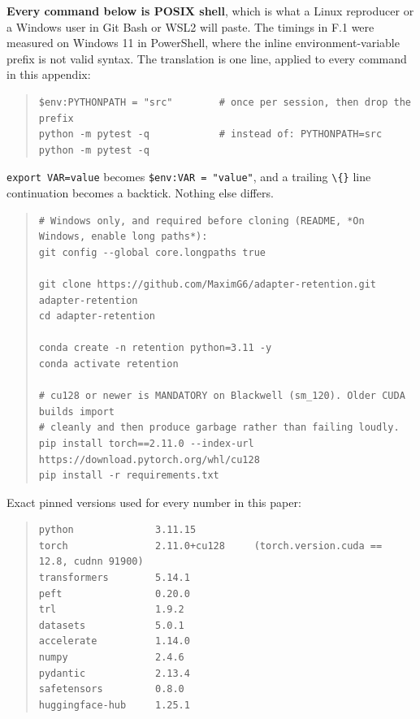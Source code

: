 \textbf{Every command below is POSIX shell}, which is what a Linux reproducer or a Windows user in Git Bash or WSL2 will paste. The timings in F.1 were measured on Windows 11 in PowerShell, where the inline environment-variable prefix is not valid syntax. The translation is one line, applied to every command in this appendix:

\begin{quote}\tiny\begin{verbatim}
$env:PYTHONPATH = "src"        # once per session, then drop the prefix
python -m pytest -q            # instead of: PYTHONPATH=src python -m pytest -q
\end{verbatim}\end{quote}

\texttt{export VAR=value} becomes \texttt{\$env:VAR = "value"}, and a trailing \texttt{\textbackslash\{\}} line continuation becomes a backtick. Nothing else differs.

\begin{quote}\tiny\begin{verbatim}
# Windows only, and required before cloning (README, *On Windows, enable long paths*):
git config --global core.longpaths true

git clone https://github.com/MaximG6/adapter-retention.git adapter-retention
cd adapter-retention

conda create -n retention python=3.11 -y
conda activate retention

# cu128 or newer is MANDATORY on Blackwell (sm_120). Older CUDA builds import
# cleanly and then produce garbage rather than failing loudly.
pip install torch==2.11.0 --index-url https://download.pytorch.org/whl/cu128
pip install -r requirements.txt
\end{verbatim}\end{quote}

Exact pinned versions used for every number in this paper:

\begin{quote}\tiny\begin{verbatim}
python              3.11.15
torch               2.11.0+cu128     (torch.version.cuda == 12.8, cudnn 91900)
transformers        5.14.1
peft                0.20.0
trl                 1.9.2
datasets            5.0.1
accelerate          1.14.0
numpy               2.4.6
pydantic            2.13.4
safetensors         0.8.0
huggingface-hub     1.25.1
\end{verbatim}\end{quote}

